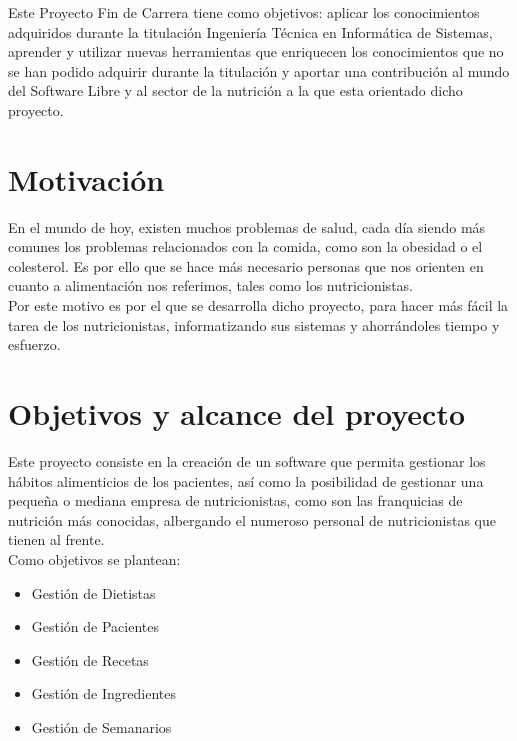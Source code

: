 

Este Proyecto Fin de Carrera tiene como objetivos: aplicar los conocimientos adquiridos durante la titulación Ingeniería Técnica en Informática de Sistemas, aprender y utilizar nuevas herramientas que enriquecen los conocimientos que no se han podido adquirir durante la titulación y aportar una contribución al mundo del Software Libre y al sector de la nutrición a la que esta orientado dicho proyecto.

\section{Motivación}
En el mundo de hoy, existen muchos problemas de salud, cada día siendo más comunes los problemas relacionados con la comida, como son la obesidad o el colesterol. Es por ello que se hace más necesario personas que nos orienten en cuanto a alimentación nos referimos, tales como los nutricionistas.\\
Por este motivo es por el que se desarrolla dicho proyecto, para hacer más fácil la tarea de los nutricionistas, informatizando sus sistemas y ahorrándoles tiempo y esfuerzo.

\section{Objetivos y alcance del proyecto} 
Este proyecto consiste en la creación de un software que permita gestionar los hábitos alimenticios de los pacientes, así como la posibilidad de gestionar una pequeña o mediana empresa de nutricionistas, como son las franquicias de nutrición más conocidas, albergando el numeroso personal de nutricionistas que tienen al frente.\\

Como objetivos se plantean:\\
\begin{itemize}
\item Gestión de Dietistas
\item Gestión de Pacientes
\item Gestión de Recetas
\item Gestión de Ingredientes
\item Gestión de Semanarios
\end{itemize}


